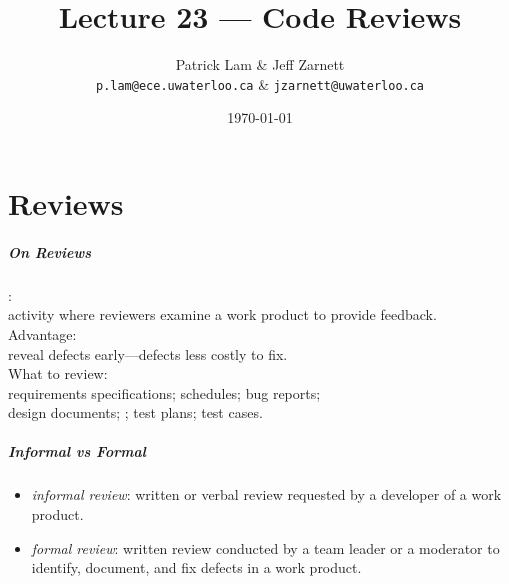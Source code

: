 

\title{Lecture 23 --- Code Reviews}

\author{Patrick Lam \& Jeff Zarnett \\ \small \texttt{p.lam@ece.uwaterloo.ca} \& \texttt{jzarnett@uwaterloo.ca}}
\date{\today}



\begin{frame}
  \titlepage
\end{frame}

\part{Reviews}
\frame{\partpage}

\begin{frame}
\frametitle{On Reviews}

\begin{changemargin}{1cm}

: \\activity where reviewers examine a work product
to provide feedback.\\[1em]

Advantage: \\
reveal defects early---defects less costly to fix.  \\[1em]

What to review:\\
requirements specifications; schedules; bug reports; \\design documents;
; test plans; test cases.

\end{changemargin}

\end{frame}

\begin{frame}
\frametitle{Informal vs Formal}

\large
\begin{changemargin}{1cm}
\begin{itemize}
\item \emph{informal review}: written or verbal review
  requested by a developer of a work product.\\[1em]
\item \emph{formal review}: written review conducted by a team
  leader or a moderator to identify, document,
  and fix defects in a work product.  
\end{itemize}
\end{changemargin}

\end{frame}

